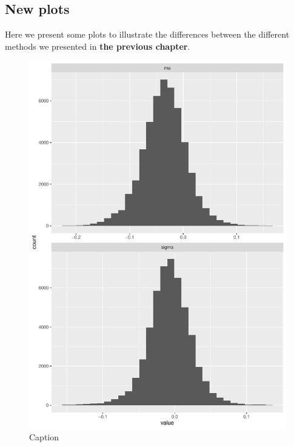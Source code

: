 \subsection{New plots}
Here we present some plots to illustrate the differences between the different methods we presented in \textbf{the previous chapter}. 
\begin{figure}[H]
    \centering
    \includegraphics[scale = 0.7, page = 3]{figures/test.pdf}
    \caption{Caption}
    \label{fig:my_label}
\end{figure}{}

